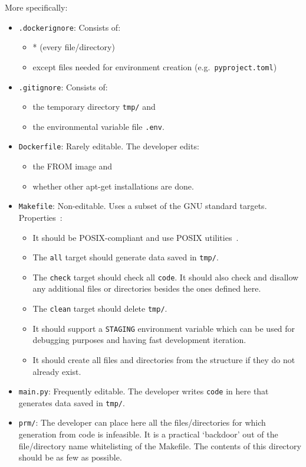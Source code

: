 \documentclass[journal]{IEEEtran}
\begin{document}
More specifically:
\begin{itemize}
	\item \texttt{.dockerignore}: Consists of:
		\begin{itemize}
			\item * (every file/directory)
			\item except files needed for environment creation (e.g.\ \texttt{pyproject.toml})
		\end{itemize}
	\item \texttt{.gitignore}: Consists of:
		\begin{itemize}
			\item the temporary directory \texttt{tmp/} and
			\item the environmental variable file \texttt{.env}.
		\end{itemize}
	\item \texttt{Dockerfile}: Rarely editable. The developer edits:
		\begin{itemize}
			\item the FROM image and
			\item whether other apt-get installations are done.
		\end{itemize}
	\item \texttt{Makefile}: Non-editable. Uses a subset of the GNU standard targets. Properties~\cite{stallman1992gnu}:
		\begin{itemize}
			\item It should be POSIX-compliant and use POSIX utilities~\cite{lewine1991posix}.
			\item The \texttt{all} target should generate data saved in \texttt{tmp/}.
			\item The \texttt{check} target should check all \texttt{code}. It should also check and disallow any additional files or directories besides the ones defined here.
			\item The \texttt{clean} target should delete \texttt{tmp/}.
			\item It should support a \texttt{STAGING} environment variable which can be used for debugging purposes and having fast development iteration.
			\item It should create all files and directories from the structure if they do not already exist.
		\end{itemize}
	\item \texttt{main.py}: Frequently editable. The developer writes \texttt{code} in here that generates data saved in \texttt{tmp/}.
	\item \texttt{prm/}: The developer can place here all the files/directories for which generation from code is infeasible. It is a practical `backdoor' out of the file/directory name whitelisting of the Makefile. The contents of this directory should be as few as possible.

\end{itemize}
\end{document}
